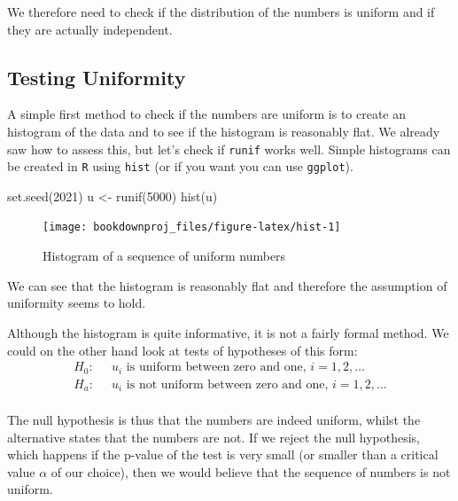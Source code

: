 \documentclass[
]{book}
\newenvironment{Shaded}{\begin{snugshade}}{\end{snugshade}}
\newcommand{\DecValTok}[1]{\textcolor[rgb]{0.00,0.00,0.81}{#1}}
\newcommand{\FunctionTok}[1]{\textcolor[rgb]{0.00,0.00,0.00}{#1}}
\newcommand{\NormalTok}[1]{#1}
\newcommand{\OtherTok}[1]{\textcolor[rgb]{0.56,0.35,0.01}{#1}}
\theoremstyle{definition}
\theoremstyle{definition}
\theoremstyle{definition}
\theoremstyle{definition}
\theoremstyle{remark}
\begin{document}
We therefore need to check if the distribution of the numbers is uniform and if they are actually independent.

\hypertarget{testing-uniformity}{%
\subsection{Testing Uniformity}\label{testing-uniformity}}

A simple first method to check if the numbers are uniform is to create an histogram of the data and to see if the histogram is reasonably flat. We already saw how to assess this, but let's check if \texttt{runif} works well. Simple histograms can be created in \texttt{R} using \texttt{hist} (or if you want you can use \texttt{ggplot}).

\begin{Shaded}
\begin{Highlighting}[]
\FunctionTok{set.seed}\NormalTok{(}\DecValTok{2021}\NormalTok{)}
\NormalTok{u }\OtherTok{\textless{}{-}} \FunctionTok{runif}\NormalTok{(}\DecValTok{5000}\NormalTok{)}
\FunctionTok{hist}\NormalTok{(u)}
\end{Highlighting}
\end{Shaded}

\begin{figure}

{\centering \texttt{[image: bookdownproj\_files/figure-latex/hist-1]} 

}

\caption{Histogram of a sequence of uniform numbers}\label{fig:hist}
\end{figure}

We can see that the histogram is reasonably flat and therefore the assumption of uniformity seems to hold.

Although the histogram is quite informative, it is not a fairly formal method. We could on the other hand look at tests of hypotheses of this form:
\begin{align*}
H_0: & \;\;u_i \mbox{ is uniform between zero and one, } i=1,2,\dots\\
H_a: & \;\;u_i \mbox{ is not uniform between zero and one, } i=1,2,\dots\\
\end{align*}

The null hypothesis is thus that the numbers are indeed uniform, whilst the alternative states that the numbers are not. If we reject the null hypothesis, which happens if the p-value of the test is very small (or smaller than a critical value \(\alpha\) of our choice), then we would believe that the sequence of numbers is not uniform.
\end{document}
